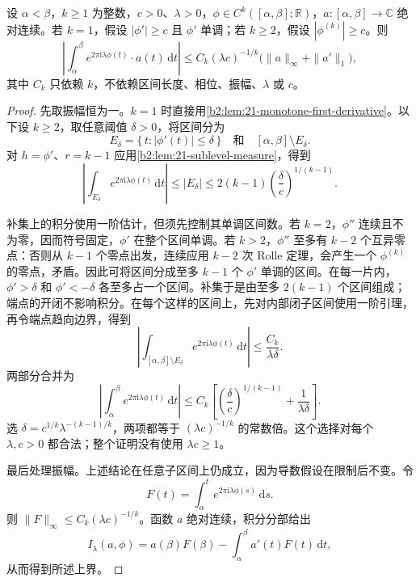 \begin{theorem}\label{b2:thm:21-vdc}
设 \(\alpha<\beta\)，\(k\geq1\) 为整数，\(c>0\)、\(\lambda>0\)，\(\phi\in C^k([\alpha,\beta];\mathbb R)\)，\(a:[\alpha,\beta]\to\mathbb C\) 绝对连续。若 \(k=1\)，假设 \(|\phi'|\geq c\) 且 \(\phi'\) 单调；若 \(k\geq2\)，假设 \(|\phi^{(k)}|\geq c\)。则
\[
 \left|\int_\alpha^\beta
 e^{2\pi\mathrm i\lambda\phi(t)}\cdot a(t)\,\mathrm dt\right|
 \leq C_k(\lambda c)^{-1/k}
       \bigl(\|a\|_\infty+\|a'\|_1\bigr),
\]
其中 \(C_k\) 只依赖 \(k\)，不依赖区间长度、相位、振幅、\(\lambda\) 或 \(c\)。
\end{theorem}
\begin{proof}
先取振幅恒为一。\(k=1\) 时直接用\cref{b2:lem:21-monotone-first-derivative}。以下设 \(k\geq2\)，取任意阈值 \(\delta>0\)，将区间分为
\[
 E_\delta=\{\,t:|\phi'(t)|\leq\delta\,\}
 \quad\text{和}\quad
 [\alpha,\beta]\setminus E_\delta.
\]
对 \(h=\phi'\)、\(r=k-1\) 应用\cref{b2:lem:21-sublevel-measure}，得到
\[
 \left|\int_{E_\delta}e^{2\pi\mathrm i\lambda\phi(t)}
                         \,\mathrm dt\right|
 \leq |E_\delta|
 \leq 2(k-1)\left(\frac{\delta}{c}\right)^{1/(k-1)}.
\]

补集上的积分使用一阶估计，但须先控制其单调区间数。若 \(k=2\)，\(\phi''\) 连续且不为零，因而符号固定，\(\phi'\) 在整个区间单调。若 \(k>2\)，\(\phi''\) 至多有 \(k-2\) 个互异零点：否则从 \(k-1\) 个零点出发，连续应用 \(k-2\) 次 Rolle 定理，会产生一个 \(\phi^{(k)}\) 的零点，矛盾。因此可将区间分成至多 \(k-1\) 个 \(\phi'\) 单调的区间。在每一片内，\(\phi'>\delta\) 和 \(\phi'<-\delta\) 各至多占一个区间。补集于是由至多 \(2(k-1)\) 个区间组成；端点的开闭不影响积分。在每个这样的区间上，先对内部闭子区间使用一阶引理，再令端点趋向边界，得到
\[
 \left|\int_{[\alpha,\beta]\setminus E_\delta}
             e^{2\pi\mathrm i\lambda\phi(t)}\,\mathrm dt\right|
 \leq \frac{C_k}{\lambda\delta}.
\]
两部分合并为
\[
 \left|\int_\alpha^\beta
          e^{2\pi\mathrm i\lambda\phi(t)}\,\mathrm dt\right|
 \leq C_k\left[
       \left(\frac{\delta}{c}\right)^{1/(k-1)}
       +\frac1{\lambda\delta}\right].
\]
选
\(\delta=c^{1/k}\lambda^{-(k-1)/k}\)，两项都等于
\((\lambda c)^{-1/k}\) 的常数倍。这个选择对每个 \(\lambda,c>0\) 都合法；整个证明没有使用 \(\lambda c\geq1\)。

最后处理振幅。上述结论在任意子区间上仍成立，因为导数假设在限制后不变。令
\[
 F(t)=\int_\alpha^t e^{2\pi\mathrm i\lambda\phi(s)}\,\mathrm ds.
\]
则 \(\|F\|_\infty\leq C_k(\lambda c)^{-1/k}\)。函数 \(a\) 绝对连续，积分分部给出
\[
 I_\lambda(a,\phi)
 =a(\beta)F(\beta)-\int_\alpha^\beta a'(t)F(t)\,\mathrm dt,
\]
从而得到所述上界。
\end{proof}

